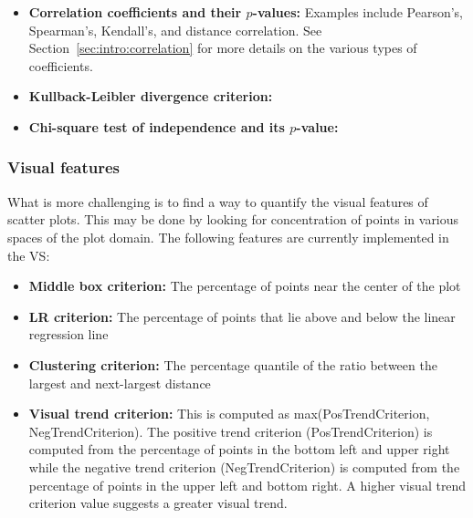 \tablespacing
\begin{itemize}
	\item \textbf{Correlation coefficients and their $p$-values:} Examples 
	include Pearson's, Spearman's, Kendall's, and distance correlation. See 
	Section~\ref{sec:intro:correlation} for more details on the various types 
	of coefficients.
	\item \textbf{Kullback-Leibler divergence criterion:}
	\item \textbf{Chi-square test of independence and its $p$-value:}
\end{itemize}
\bodyspacing 

\subsubsection{Visual features}

What is more challenging is to find a way to quantify the visual features of 
scatter plots. This may be done by looking for concentration of points in 
various spaces of the plot domain. The following features are currently 
implemented in the VS: 

\tablespacing
\begin{itemize}
	\item \textbf{Middle box criterion:} The percentage of points near the 
	center of the plot
	\item \textbf{LR criterion:} The percentage of points that lie above and 
	below the linear regression line
	\item \textbf{Clustering criterion:} The percentage quantile of the ratio 
	between the largest and next-largest distance
	\item \textbf{Visual trend criterion:} This is computed as 
	max(PosTrendCriterion, NegTrendCriterion). The positive trend criterion 
	(PosTrendCriterion) is computed from the percentage of points in the bottom 
	left and upper right while the negative trend criterion (NegTrendCriterion) 
	is computed from the percentage of points in the upper left and 
	bottom right. A higher visual trend criterion value suggests a greater 
	visual trend. 
\end{itemize}
\bodyspacing